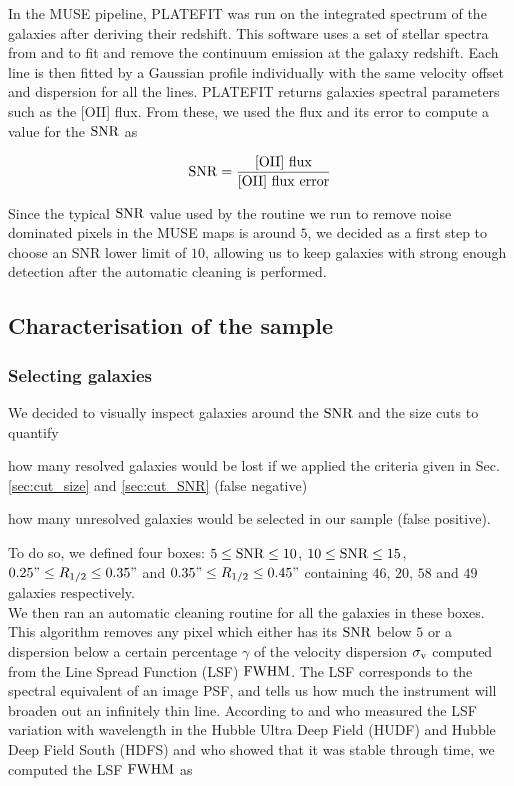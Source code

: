 In the MUSE pipeline, \textsc{PLATEFIT}  was run on the integrated spectrum of the galaxies after deriving their redshift. This software uses a set of stellar spectra from  and  to fit and remove the continuum emission at the galaxy redshift. Each line is then fitted by a Gaussian profile individually with the same velocity offset and dispersion for all the lines. \textsc{PLATEFIT} returns galaxies spectral parameters such as the [OII] flux. From these, we used the flux and its error to compute a value for the $\rm{SNR}$ as

\begin{equation}
	\rm{SNR} = \frac{\rm{[OII] \,\, flux}}{\rm{[OII] \,\, flux \,\, error}}
\end{equation}

Since the typical $\rm{SNR}$ value used by the routine we run to remove noise dominated pixels in the MUSE maps is around $5$, we decided as a first step to choose an SNR lower limit of $10$, allowing us to keep galaxies with strong enough detection after the automatic cleaning is performed.


\subsection{Characterisation of the sample}
\label{sec:sample_characterisation}

\subsubsection{Selecting galaxies}
\label{sec:selecting_galaxies}

We decided to visually inspect galaxies around the $\rm{SNR}$ and the size cuts to quantify
\begin{enumerate*}[label={(\alph*)}]
	\item how many resolved galaxies would be lost if we applied the criteria given in Sec.\,\ref{sec:cut_size} and \ref{sec:cut_SNR} (false negative)
	\item how many unresolved galaxies would be selected in our sample (false positive).
\end{enumerate*}
To do so, we defined four boxes: $5 \leq \rm{SNR} \leq 10$, $10 \le \rm{SNR} \leq 15$, $0.25" \leq R_{1/2} \leq 0.35"$ and $0.35" \le R_{1/2} \leq 0.45"$ containing $46$, $20$, $58$ and $49$ galaxies respectively. \\

We then ran an automatic cleaning routine for all the galaxies in these boxes. This algorithm removes any pixel which either has its $\rm{SNR}$ below $5$ or a dispersion below a certain percentage $\gamma$ of the velocity dispersion $\sigma_{\rm{v}}$ computed from the Line Spread Function (LSF) $\rm{FWHM}$. The LSF corresponds to the spectral equivalent of an image PSF, and tells us how much the instrument will broaden out an infinitely thin line. According to  and  who measured the LSF variation with wavelength in the Hubble Ultra Deep Field (HUDF) and Hubble Deep Field South (HDFS) and who showed that it was stable through time, we computed the LSF $\rm{FWHM}$ as


